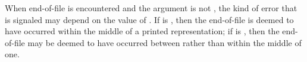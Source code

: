 When end-of-file is encountered and the  argument
is not \nil, the kind of error that is signaled may depend on the value
of .  If  
is , then the end-of-file
is deemed to have occurred within the middle of a printed representation;
if  is , then the end-of-file may be deemed to have
occurred between  rather than within the middle of one.

\endlist

\endsubsubsection%

\endsubsection%
